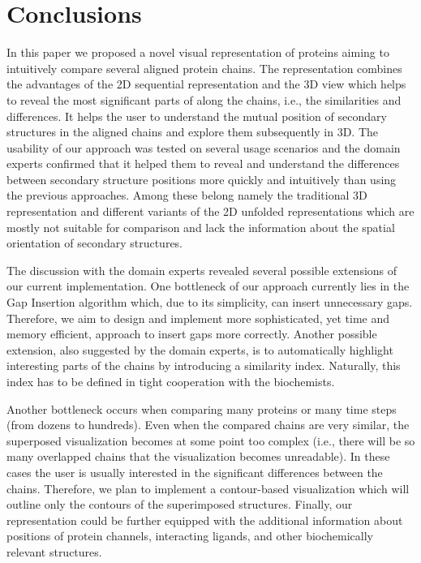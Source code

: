 \documentclass[twocolumn]{bmcart}%
\begin{document}
\section*{Conclusions}
In this paper we proposed a novel visual representation of proteins aiming to intuitively compare several aligned protein chains.
The representation combines the advantages of the 2D sequential representation and the 3D view which helps to reveal the most significant parts of along the chains, i.e., the similarities and differences. 
It helps the user to understand the mutual position of secondary structures in the aligned chains and explore them subsequently in 3D.
The usability of our approach was tested on several usage scenarios and the domain experts confirmed that it helped them to reveal and understand the differences between secondary structure positions more quickly and intuitively than using the previous approaches.
Among these belong namely the traditional 3D representation and different variants of the 2D unfolded representations which are mostly not suitable for comparison and lack the information about the spatial orientation of secondary structures.

The discussion with the domain experts revealed several possible extensions of our current implementation.
One bottleneck of our approach currently lies in the Gap Insertion algorithm which, due to its simplicity, can insert unnecessary gaps.
Therefore, we aim to design and implement more sophisticated, yet time and memory efficient, approach to insert gaps more correctly.
Another possible extension, also suggested by the domain experts, is to automatically highlight interesting parts of the chains by introducing a similarity index.
Naturally, this index has to be defined in tight cooperation with the biochemists.

Another bottleneck occurs when comparing many proteins or many time steps (from dozens to hundreds).
Even when the compared chains are very similar, the superposed visualization becomes at some point too complex (i.e., there will be so many overlapped chains that the visualization becomes unreadable).
In these cases the user is usually interested in the significant differences between the chains.
Therefore, we plan to implement a contour-based visualization which will outline only the contours of the superimposed structures.
Finally, our representation could be further equipped with the additional information about positions of protein channels, interacting ligands, and other biochemically relevant structures.
\end{document}
